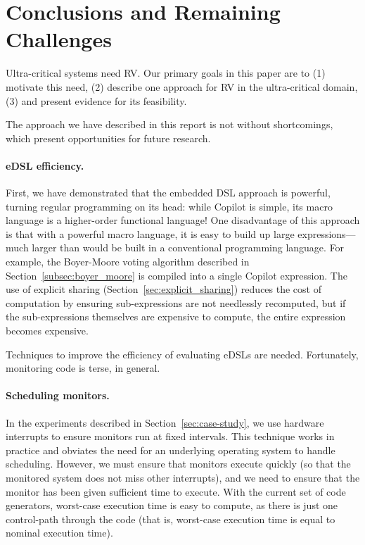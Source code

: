 \section{Conclusions and Remaining Challenges}
\label{sec:conclusions}
Ultra-critical systems need RV.  Our primary goals in this paper are to (1)
motivate this need, (2) describe one approach for RV in the ultra-critical
domain, (3) and present evidence for its feasibility.

The approach we have described in this report is not without shortcomings, which
present opportunities for future research.

\paragraph{eDSL efficiency.}
First, we have demonstrated that the embedded DSL approach is powerful,
turning regular programming on its head: while Copilot is simple, its
macro language is a higher-order functional language!  One disadvantage of this
approach is that with a powerful macro language, it is easy to
build up large expressions---much larger than would be built in a
conventional programming language.  For example, the Boyer-Moore
voting algorithm described in Section~\ref{subsec:boyer_moore} is compiled into
a single Copilot expression.  The use of explicit sharing
(Section~\ref{sec:explicit_sharing}) reduces the cost of computation by ensuring
sub-expressions are not needlessly recomputed, but if the sub-expressions
themselves are expensive to compute, the entire expression becomes expensive.

Techniques to improve the efficiency of evaluating eDSLs are needed.
Fortunately, monitoring code is terse, in general.  

\paragraph{Scheduling monitors.}
In the experiments described in Section~\ref{sec:case-study}, we use hardware
interrupts to ensure monitors run at fixed intervals.  This technique works in
practice and obviates the need for an underlying operating system to handle
scheduling.  However, we must ensure that monitors execute quickly (so that the
monitored system does not miss other interrupts), and we need to ensure that the
monitor has been given sufficient time to execute.  With the current set of code
generators, worst-case execution time is easy to compute, as there is just one
control-path through the code (that is, worst-case execution time is equal to
nominal execution time).  

